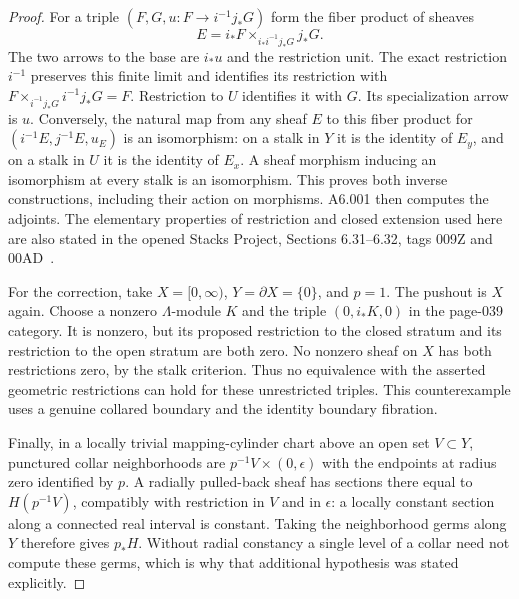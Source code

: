 \begin{proof}
For a triple $(F,G,u:F\to i^{-1}j_*G)$ form the fiber product of
sheaves
\[
 E=i_*F\mathbin{\times}_{i_*i^{-1}j_*G}j_*G.
\]
The two arrows to the base are $i_*u$ and the restriction unit.
The exact restriction $i^{-1}$ preserves this finite limit and
identifies its restriction with $F\times_{i^{-1}j_*G}i^{-1}j_*G=F$.
Restriction to $U$ identifies it with $G$. Its specialization arrow
is $u$. Conversely, the natural map from any sheaf $E$ to this fiber
product for $(i^{-1}E,j^{-1}E,u_E)$ is an isomorphism: on a stalk in
$Y$ it is the identity of $E_y$, and on a stalk in $U$ it is the
identity of $E_x$. A sheaf morphism inducing an isomorphism at every
stalk is an isomorphism. This proves both inverse constructions,
including their action on morphisms. A6.001 then computes the
adjoints. The elementary properties of restriction and closed
extension used here are also stated in the opened Stacks Project,
Sections 6.31--6.32, tags 009Z and 00AD~\cite{StacksSheavesOpenClosed}.

For the correction, take $X=[0,\infty)$, $Y=\partial X=\{0\}$,
and $p=1$. The pushout is $X$ again. Choose a nonzero $\Lambda$-module
$K$ and the triple $(0,i_*K,0)$ in the page-039 category.
It is nonzero, but its proposed restriction to the closed stratum
and its restriction to the open stratum are both zero. No nonzero
sheaf on $X$ has both restrictions zero, by the stalk criterion.
Thus no equivalence with the asserted geometric restrictions can
hold for these unrestricted triples. This counterexample uses a
genuine collared boundary and the identity boundary fibration.

Finally, in a locally trivial mapping-cylinder chart above an open
set $V\subset Y$, punctured collar neighborhoods are
$p^{-1}V\times(0,\epsilon)$ with the endpoints at radius zero
identified by $p$. A radially pulled-back sheaf has sections there
equal to $H(p^{-1}V)$, compatibly with restriction in $V$ and in
$\epsilon$: a locally constant section along a connected real
interval is constant. Taking the neighborhood germs along $Y$
therefore gives
$p_*H$. Without radial constancy a single level of a collar need
not compute these germs, which is why that additional hypothesis
was stated explicitly.
\end{proof}


